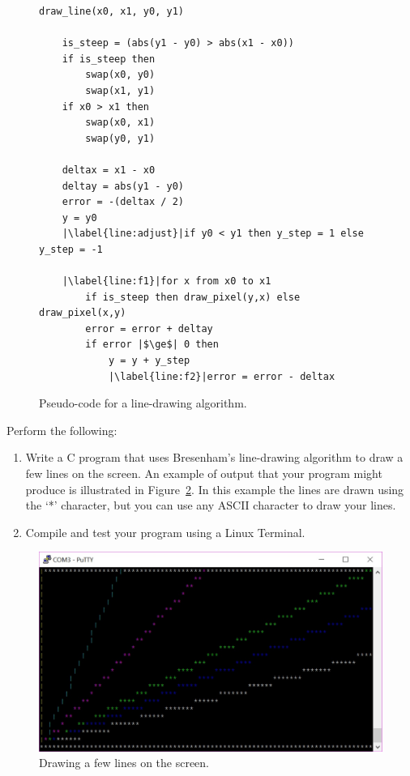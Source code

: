 \documentclass[epsfig,10pt,fullpage]{article}
\begin{document}
\begin{figure}[h]
\begin{center}
\begin{minipage}[t]{12.5 cm}
\begin{lstlisting}[name=bresenham]
draw_line(x0, x1, y0, y1)

	is_steep = (abs(y1 - y0) > abs(x1 - x0))
	if is_steep then
		swap(x0, y0)
		swap(x1, y1)
	if x0 > x1 then
		swap(x0, x1)
		swap(y0, y1)

	deltax = x1 - x0
	deltay = abs(y1 - y0)
	error = -(deltax / 2)
	y = y0
	|\label{line:adjust}|if y0 < y1 then y_step = 1 else y_step = -1

	|\label{line:f1}|for x from x0 to x1
		if is_steep then draw_pixel(y,x) else draw_pixel(x,y)
		error = error + deltay
		if error |$\ge$| 0 then
			y = y + y_step
			|\label{line:f2}|error = error - deltax
\end{lstlisting}
\end{minipage}
\caption{Pseudo-code for a line-drawing algorithm.}
\label{fig:bresenham}
\end{center}
\end{figure}

\noindent
Perform the following:

\begin{enumerate}

\item Write a C program that uses Bresenham's line-drawing algorithm to draw a few lines on 
the screen.  An example of output that your program might produce is illustrated in 
Figure~\ref{fig:lines}. In this example the lines are drawn using the `*' character, but
you can use any ASCII character to draw your lines.

\item Compile and test your program using a Linux Terminal.

\end{enumerate}

\begin{figure}[h]
   \begin{center}
			  \includegraphics[width=12cm]{figures/lines}
   \end{center}
   \caption{Drawing a few lines on the screen.}
	\label{fig:lines}
\end{figure}
\end{document}
